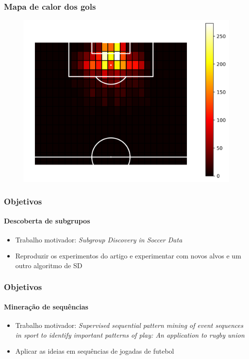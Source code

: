 \documentclass{beamer}
\begin{document}
\begin{frame}
    \frametitle{Mapa de calor dos gols}
\begin{figure}[H]
\centering
\includegraphics[width=\linewidth]{../report/images/goal_position_heatmap.png}
\end{figure}
\end{frame}

\begin{frame}
\frametitle{Objetivos}
\framesubtitle{Descoberta de subgrupos}
\begin{itemize}
    \item Trabalho motivador: \textit{Subgroup Discovery in Soccer Data}
    \item Reproduzir os experimentos do artigo e experimentar com novos alvos e um outro algoritmo de SD
\end{itemize}
\end{frame}

\begin{frame}
\frametitle{Objetivos}
\framesubtitle{Mineração de sequências}
\begin{itemize}
    \item Trabalho motivador: \textit{Supervised sequential pattern mining of event sequences in sport to identify important patterns of play: An application to rugby union}
    \item Aplicar as ideias em sequências de jogadas de futebol
\end{itemize}
\end{frame}
\end{document}
